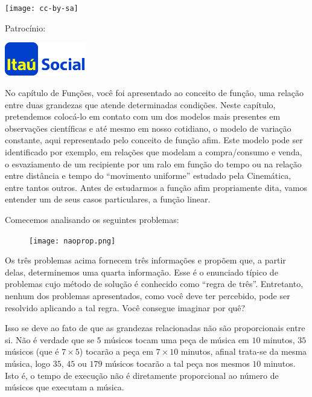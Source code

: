 \begin{minipage}[l]{5cm}
  \texttt{[image: cc-by-sa]}
\end{minipage}\hfill
\begin{minipage}[r]{5cm}
{\Large  Patrocínio:}
  
  \includegraphics[width=3.5cm]{itau}
\end{minipage}

\clearpage

\label{funcaolinear}
No capítulo de Funções, você foi apresentado ao conceito de função, uma relação entre duas grandezas que atende determinadas condições. Neste capítulo, pretendemos colocá-lo em contato com um dos modelos mais presentes em observações científicas e até mesmo em nosso cotidiano, o modelo de variação constante, aqui representado pelo conceito de função afim. Este modelo pode ser identificado por exemplo, em relações que modelam a compra/consumo e venda, o esvaziamento de um recipiente por um ralo em função do tempo ou na relação entre distância e tempo do “movimento uniforme” estudado pela Cinemática, entre tantos outros. Antes de estudarmos a função afim propriamente dita, vamos entender um de seus casos particulares, a função linear.

Comecemos analisando os seguintes problemas:

\begin{figure}[H]
\centering
\noindent\texttt{[image: naoprop.png]}
\end{figure}


Os três problemas acima fornecem três informações e propõem que, a partir delas, determinemos uma quarta informação. Esse é o enunciado típico de problemas cujo método de solução é conhecido como “regra de três”. Entretanto, nenhum dos problemas apresentados, como você deve ter percebido, pode ser resolvido aplicando a tal regra. Você consegue imaginar por quê?

Isso se deve ao fato de que as grandezas relacionadas não são proporcionais entre si. Não é verdade que se \(5\) músicos tocam uma peça de música em \(10\) minutos, \(35\) músicos (que é \(7 \times 5\)) tocarão a peça em \(7 \times 10\) minutos, afinal trata-se da mesma música, logo \(35\), \(45\) ou \(179\) músicos tocarão a tal peça nos mesmos \(10\) minutos. Isto é, o tempo de execução não é diretamente proporcional ao número de músicos que executam a música.

